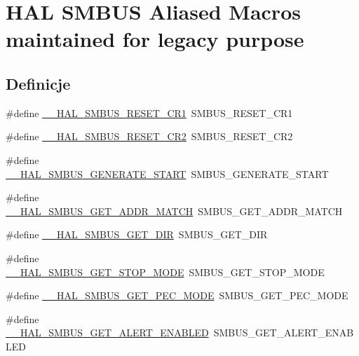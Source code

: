\hypertarget{group___h_a_l___s_m_b_u_s___aliased___macros}{}\section{H\+AL S\+M\+B\+US Aliased Macros maintained for legacy purpose}
\label{group___h_a_l___s_m_b_u_s___aliased___macros}
\subsection*{Definicje}
\begin{DoxyCompactItemize}
\item 
\#define \hyperlink{group___h_a_l___s_m_b_u_s___aliased___macros_ga6a63af46bb422e4406613f0053d202d3}{\+\_\+\+\_\+\+H\+A\+L\+\_\+\+S\+M\+B\+U\+S\+\_\+\+R\+E\+S\+E\+T\+\_\+\+C\+R1}~S\+M\+B\+U\+S\+\_\+\+R\+E\+S\+E\+T\+\_\+\+C\+R1
\item 
\#define \hyperlink{group___h_a_l___s_m_b_u_s___aliased___macros_ga070a7fc0c22c90fab03d5b17b0cdd896}{\+\_\+\+\_\+\+H\+A\+L\+\_\+\+S\+M\+B\+U\+S\+\_\+\+R\+E\+S\+E\+T\+\_\+\+C\+R2}~S\+M\+B\+U\+S\+\_\+\+R\+E\+S\+E\+T\+\_\+\+C\+R2
\item 
\#define \hyperlink{group___h_a_l___s_m_b_u_s___aliased___macros_gaf2c39644ee8411a47a0e439e008ac559}{\+\_\+\+\_\+\+H\+A\+L\+\_\+\+S\+M\+B\+U\+S\+\_\+\+G\+E\+N\+E\+R\+A\+T\+E\+\_\+\+S\+T\+A\+RT}~S\+M\+B\+U\+S\+\_\+\+G\+E\+N\+E\+R\+A\+T\+E\+\_\+\+S\+T\+A\+RT
\item 
\#define \hyperlink{group___h_a_l___s_m_b_u_s___aliased___macros_ga913762172b8ae232aaa16c5b8f36c7e9}{\+\_\+\+\_\+\+H\+A\+L\+\_\+\+S\+M\+B\+U\+S\+\_\+\+G\+E\+T\+\_\+\+A\+D\+D\+R\+\_\+\+M\+A\+T\+CH}~S\+M\+B\+U\+S\+\_\+\+G\+E\+T\+\_\+\+A\+D\+D\+R\+\_\+\+M\+A\+T\+CH
\item 
\#define \hyperlink{group___h_a_l___s_m_b_u_s___aliased___macros_ga8c90e18710300f757820a2d859f2c831}{\+\_\+\+\_\+\+H\+A\+L\+\_\+\+S\+M\+B\+U\+S\+\_\+\+G\+E\+T\+\_\+\+D\+IR}~S\+M\+B\+U\+S\+\_\+\+G\+E\+T\+\_\+\+D\+IR
\item 
\#define \hyperlink{group___h_a_l___s_m_b_u_s___aliased___macros_gae2ed3da7b973e48e3dbe0a3a4591cdb8}{\+\_\+\+\_\+\+H\+A\+L\+\_\+\+S\+M\+B\+U\+S\+\_\+\+G\+E\+T\+\_\+\+S\+T\+O\+P\+\_\+\+M\+O\+DE}~S\+M\+B\+U\+S\+\_\+\+G\+E\+T\+\_\+\+S\+T\+O\+P\+\_\+\+M\+O\+DE
\item 
\#define \hyperlink{group___h_a_l___s_m_b_u_s___aliased___macros_gaba8cf3309454005de9d6f470b30dcda8}{\+\_\+\+\_\+\+H\+A\+L\+\_\+\+S\+M\+B\+U\+S\+\_\+\+G\+E\+T\+\_\+\+P\+E\+C\+\_\+\+M\+O\+DE}~S\+M\+B\+U\+S\+\_\+\+G\+E\+T\+\_\+\+P\+E\+C\+\_\+\+M\+O\+DE
\item 
\#define \hyperlink{group___h_a_l___s_m_b_u_s___aliased___macros_gaa60bf234087ae7f6c3d912ca6b65897c}{\+\_\+\+\_\+\+H\+A\+L\+\_\+\+S\+M\+B\+U\+S\+\_\+\+G\+E\+T\+\_\+\+A\+L\+E\+R\+T\+\_\+\+E\+N\+A\+B\+L\+ED}~S\+M\+B\+U\+S\+\_\+\+G\+E\+T\+\_\+\+A\+L\+E\+R\+T\+\_\+\+E\+N\+A\+B\+L\+ED
\end{DoxyCompactItemize}


